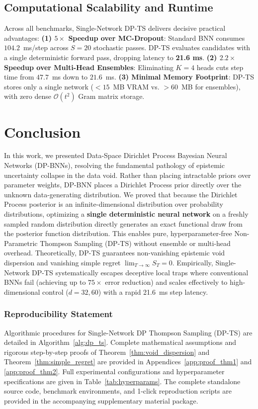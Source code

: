 \documentclass{article}
\begin{document}
\subsection{Computational Scalability and Runtime}
Across all benchmarks, Single-Network DP-TS delivers decisive practical advantages:
\textbf{(1) $5\times$ Speedup over MC-Dropout}: Standard BNN consumes $104.2$~ms/step across $S=20$ stochastic passes. DP-TS evaluates candidates with a single deterministic forward pass, dropping latency to \textbf{21.6 ms}.
\textbf{(2) $2.2\times$ Speedup over Multi-Head Ensembles}: Eliminating $K=4$ heads cuts step time from $47.7$~ms down to $21.6$~ms.
\textbf{(3) Minimal Memory Footprint}: DP-TS stores only a single network ($<15$~MB VRAM vs. $>60$~MB for ensembles), with zero dense $\mathcal{O}(t^2)$ Gram matrix storage.

\section{Conclusion}
\label{sec:conclusion}
In this work, we presented Data-Space Dirichlet Process Bayesian Neural Networks (DP-BNNs), resolving the fundamental pathology of epistemic uncertainty collapse in the data void. Rather than placing intractable priors over parameter weights, DP-BNN places a Dirichlet Process prior directly over the unknown data-generating distribution. We proved that because the Dirichlet Process posterior is an infinite-dimensional distribution over probability distributions, optimizing a \textbf{single deterministic neural network} on a freshly sampled random distribution directly generates an exact functional draw from the posterior function distribution. This enables pure, hyperparameter-free Non-Parametric Thompson Sampling (DP-TS) without ensemble or multi-head overhead. Theoretically, DP-TS guarantees non-vanishing epistemic void dispersion and vanishing simple regret $\lim_{T \to \infty} S_T = 0$. Empirically, Single-Network DP-TS systematically escapes deceptive local traps where conventional BNNs fail (achieving up to $75\times$ error reduction) and scales effectively to high-dimensional control ($d=32, 60$) with a rapid 21.6~ms step latency.

\subsubsection*{Reproducibility Statement}
Algorithmic procedures for Single-Network DP Thompson Sampling (DP-TS) are detailed in Algorithm~\ref{alg:dp_ts}. Complete mathematical assumptions and rigorous step-by-step proofs of Theorem~\ref{thm:void_dispersion} and Theorem~\ref{thm:simple_regret} are provided in Appendices~\ref{app:proof_thm1} and \ref{app:proof_thm2}. Full experimental configurations and hyperparameter specifications are given in Table~\ref{tab:hyperparams}. The complete standalone source code, benchmark environments, and 1-click reproduction scripts are provided in the accompanying supplementary material package.
\end{document}
